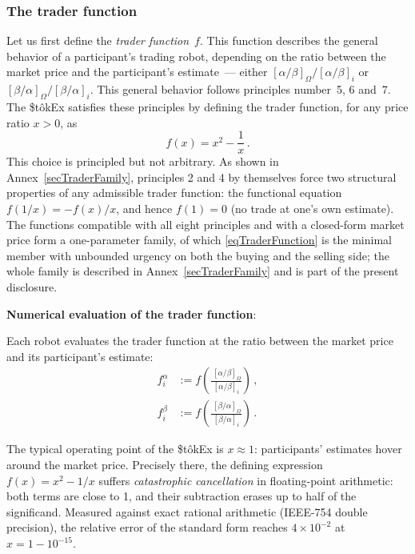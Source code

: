 \documentclass[letterpaper]{article}
\newcommand{\priceAB}{\left[\alpha / \beta\right]}
\newcommand{\priceBA}{\left[\beta / \alpha\right]}
\newcommand{\StokEx}{\$t\^{o}kEx}
\begin{document}
\clearpage
\subsubsection{The trader function}

Let us first define the \emph{trader function}~$f$.
This function describes the general behavior of a participant's trading robot, depending on the ratio between the market price and the participant's estimate~--- either $\priceAB_\Omega / \priceAB_i$ or $\priceBA_\Omega / \priceBA_i$.
This general behavior follows principles number~5, 6 and~7. The \StokEx{} satisfies these principles by defining the trader function, for any price ratio $x > 0$, as
\begin{equation}
    f(x) = x^2 - \frac{1}{x}\,. \label{eqTraderFunction}
\end{equation}
This choice is principled but not arbitrary. As shown in Annex~\ref{secTraderFamily}, principles 2 and 4 by themselves force two structural properties of any admissible trader function:
the functional equation $f(1/x) = -f(x)/x$, and hence $f(1) = 0$ (no trade at one's own estimate).
The functions compatible with all eight principles and with a closed-form market price form a one-parameter family, of which \eqref{eqTraderFunction} is the minimal member with unbounded urgency on both the buying and the selling side;
the whole family is described in Annex~\ref{secTraderFamily} and is part of the present disclosure.

\textbf{Numerical evaluation of the trader function}:

Each robot evaluates the trader function at the ratio between the market price and its participant's estimate:
\begin{align}
f_i^\alpha &:= f\!\left(\frac{\hspace{2pt}\priceAB_\Omega}{\priceAB_i} \right)\, , \nonumber \\
f_i^\beta &:= f\!\left(\frac{\hspace{2pt}\priceBA_\Omega}{\priceBA_i} \right) \, .
\label{eqFunctionX}
\end{align}

The typical operating point of the \StokEx{} is $x \approx 1$: participants' estimates hover around the market price. Precisely there, the defining expression $f(x) = x^2 - 1/x$ suffers \emph{catastrophic cancellation} in floating-point arithmetic:
both terms are close to 1, and their subtraction erases up to half of the significand. Measured against exact rational arithmetic (IEEE-754 double precision), the relative error of the standard form reaches $4 \times 10^{-2}$ at $x = 1 - 10^{-15}$.
\end{document}
